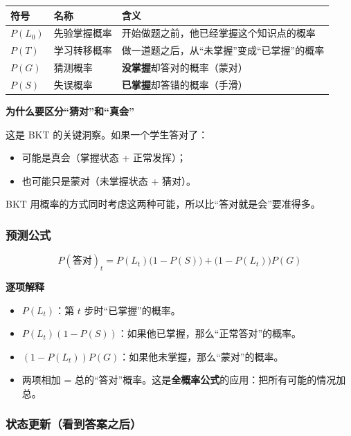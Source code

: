 \documentclass[UTF8,a4paper,11pt]{ctexart}
\newenvironment{explainbox}[1]
{\begin{center}\begin{minipage}{0.94\textwidth}\colorbox{boxbg}{\parbox{0.92\textwidth}{\textbf{#1}\par\vspace{2pt}}}}
{\end{minipage}\end{center}}
\newcommand{\hl}[1]{\textcolor{blue!70!black}{\textbf{#1}}}
\begin{document}
\begin{longtable}{@{}p{2.2cm}p{3.0cm}p{8.6cm}@{}}
\toprule
\textbf{符号} & \textbf{名称} & \textbf{含义} \\
\midrule
$P(L_0)$ & 先验掌握概率 & 开始做题之前，他已经掌握这个知识点的概率 \\
$P(T)$ & 学习转移概率 & 做一道题之后，从“未掌握”变成“已掌握”的概率 \\
$P(G)$ & 猜测概率 & \textbf{没掌握}却答对的概率（蒙对） \\
$P(S)$ & 失误概率 & \textbf{已掌握}却答错的概率（手滑） \\
\bottomrule
\end{longtable}

\begin{explainbox}{为什么要区分“猜对”和“真会”}
这是 BKT 的关键洞察。如果一个学生答对了：
\begin{itemize}[leftmargin=1.4em,itemsep=1pt]
\item 可能是真会（掌握状态 + 正常发挥）；
\item 也可能只是蒙对（未掌握状态 + 猜对）。
\end{itemize}
BKT 用概率的方式同时考虑这两种可能，所以比“答对就是会”要准得多。
\end{explainbox}

\subsubsection{预测公式}

\begin{equation}
P(\text{答对})_t = P(L_t)\big(1 - P(S)\big) + \big(1 - P(L_t)\big)P(G)
\label{p1:eq:bkt-predict}
\end{equation}

\begin{explainbox}{逐项解释}
\begin{itemize}[leftmargin=1.4em,itemsep=1pt]
\item $P(L_t)$：第 $t$ 步时“已掌握”的概率。
\item $P(L_t)(1-P(S))$：如果他已掌握，那么“正常答对”的概率。
\item $(1-P(L_t))P(G)$：如果他未掌握，那么“蒙对”的概率。
\item 两项相加 = 总的“答对”概率。这是\hl{全概率公式}的应用：把所有可能的情况加总。
\end{itemize}
\end{explainbox}

\subsubsection{状态更新（看到答案之后）}
\end{document}
